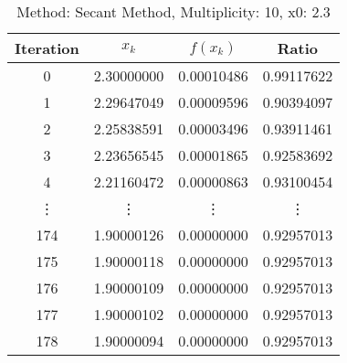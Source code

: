 \begin{table}
\centering
\caption{Method: Secant Method, Multiplicity: 10, x0: 2.3}
\label{tab:table_Secant_Method_10_2_3}
\begin{tabular}{c c c c}
\toprule
Iteration &      $x_k$ &   $f(x_k)$ &      Ratio \\
\midrule
        0 & 2.30000000 & 0.00010486 & 0.99117622 \\
        1 & 2.29647049 & 0.00009596 & 0.90394097 \\
        2 & 2.25838591 & 0.00003496 & 0.93911461 \\
        3 & 2.23656545 & 0.00001865 & 0.92583692 \\
        4 & 2.21160472 & 0.00000863 & 0.93100454 \\
   \vdots &     \vdots &     \vdots &     \vdots \\
      174 & 1.90000126 & 0.00000000 & 0.92957013 \\
      175 & 1.90000118 & 0.00000000 & 0.92957013 \\
      176 & 1.90000109 & 0.00000000 & 0.92957013 \\
      177 & 1.90000102 & 0.00000000 & 0.92957013 \\
      178 & 1.90000094 & 0.00000000 & 0.92957013 \\
\bottomrule
\end{tabular}
\end{table}
